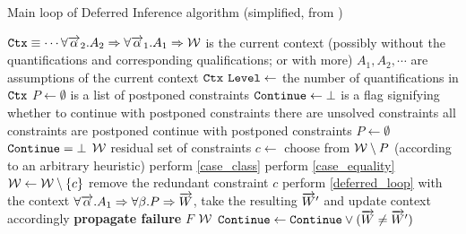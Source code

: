 \begin{algorithm}
    \caption{Main loop of Deferred Inference algorithm (simplified, from \citet{peytonjones2019type})}
    \label{deferred_loop}
    \begin{algorithmic}
        \Require $\mathtt{Ctx} \equiv \cdots \forall \overrightarrow{\alpha}_2 . A_2 \Rightarrow \forall \overrightarrow{\alpha}_1 . A_1 \Rightarrow \mathcal W$ is the current context (possibly without the quantifications and corresponding qualifications; or with more)
        \State \Comment $A_1, A_2, \cdots$ are assumptions of the current context $\mathtt{Ctx}$
        \State $\mathtt{Level} \gets$ the number of quantifications in $\mathtt{Ctx}$
        \State $P \gets \emptyset$ is a list of postponed constraints
        \State $\mathtt{Continue} \gets \bot$ is a flag signifying whether to continue with postponed constraints
         \Comment there are unsolved constraints
             \Comment all constraints are postponed
                 \Comment continue with postponed constraints
                    \State $P \gets \emptyset$
                    \State $\mathtt{Continue} = \bot$
                \Else
                    \State \Return $\mathcal W$ \Comment residual set of constraints
                \EndIf
            \EndIf
            \State $c \gets $ choose from $\mathcal W \setminus P$ (according to an arbitrary heuristic)
                \State perform \cref{case_class}
                \State perform \cref{case_equality}
                    \State $\mathcal W \gets \mathcal W \setminus \{c\}$ \Comment remove the redundant constraint $c$
                \Else
                    \State perform \cref{deferred_loop} with the context $\forall \overrightarrow{\alpha} . A_1 \Rightarrow \forall \beta . P \Rightarrow \overrightarrow{W}$, take the resulting $\overrightarrow{W}'$ and update context accordingly
                        \State \textbf{propagate failure} $F$
                        \State \Return $\mathcal W$
                    \EndIf
                    \State $\mathtt{Continue} \gets \mathtt{Continue} \lor (\overrightarrow{W} \neq \overrightarrow{W}')$
                \EndIf
            \EndIf
        \EndWhile
    \end{algorithmic}
\end{algorithm}
